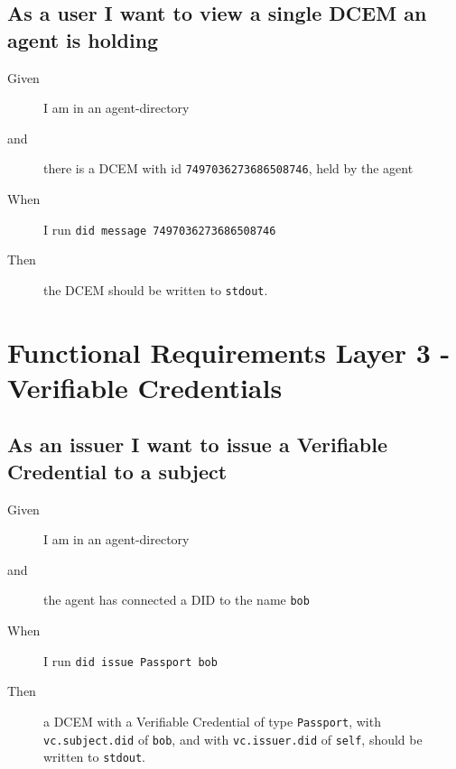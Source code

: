 \subsection{As a user I want to view a single DCEM an agent is holding}
\begin{description}\begin{description}
    \item[Given] I am in an agent-directory
    \item[and] there is a DCEM with id \texttt{7497036273686508746}, held by the agent
    \item[When] I run \texttt{did message 7497036273686508746}
    \item[Then] the DCEM should be written to \texttt{stdout}.
\end{description}\end{description}



\newpage



\section{Functional Requirements Layer 3 - Verifiable Credentials}



\subsection{As an issuer I want to issue a Verifiable Credential to a subject}
\begin{description}\begin{description}
    \item[Given] I am in an agent-directory
    \item[and] the agent has connected a DID to the name \texttt{bob}
    \item[When] I run \texttt{did issue Passport bob}
    \item[Then] a DCEM with a Verifiable Credential of type \texttt{Passport}, with \texttt{vc.subject.did} of \texttt{bob}, and with \texttt{vc.issuer.did} of \texttt{self}, should be written to \texttt{stdout}.
\end{description}\end{description}




